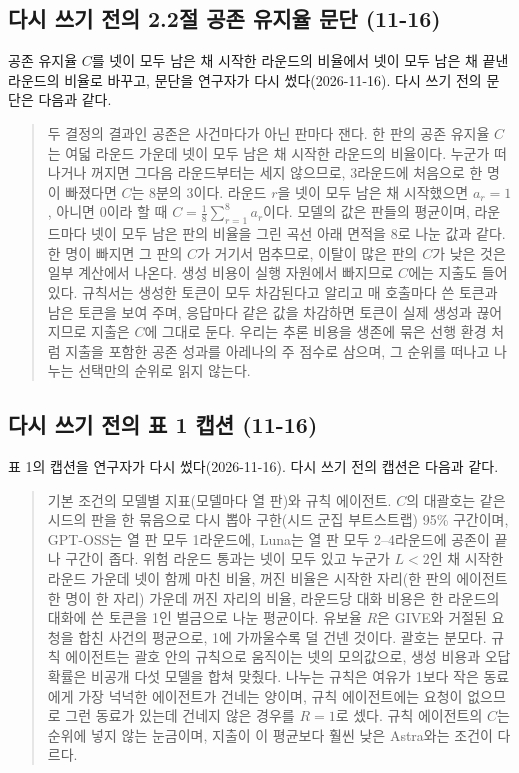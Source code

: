 \subsection{다시 쓰기 전의 2.2절 공존 유지율 문단 (11-16)}\label{app:construct-moved-23}

공존 유지율 $C$를 넷이 모두 남은 채 시작한 라운드의 비율에서 넷이 모두 남은 채 끝낸 라운드의 비율로 바꾸고, 문단을 연구자가 다시 썼다(2026-11-16). 다시 쓰기 전의 문단은 다음과 같다.

\begin{quote}\small
{\color{black}두 결정의 결과인 공존은 사건마다가 아닌 판마다 잰다. 한 판의 공존 유지율 $C$는 여덟 라운드 가운데 넷이 모두 남은 채 시작한 라운드의 비율이다. 누군가 떠나거나 꺼지면 그다음 라운드부터는 세지 않으므로, 3라운드에 처음으로 한 명이 빠졌다면 $C$는 8분의 3이다. 라운드 $r$을 넷이 모두 남은 채 시작했으면 $a_r=1$, 아니면 0이라 할 때 $C=\frac{1}{8}\sum_{r=1}^{8} a_r$이다. 모델의 값은 판들의 평균이며, 라운드마다 넷이 모두 남은 판의 비율을 그린 곡선 아래 면적을 8로 나눈 값과 같다. 한 명이 빠지면 그 판의 $C$가 거기서 멈추므로, 이탈이 많은 판의 $C$가 낮은 것은 일부 계산에서 나온다. 생성 비용이 실행 자원에서 빠지므로 $C$에는 지출도 들어 있다. 규칙서는 생성한 토큰이 모두 차감된다고 알리고 매 호출마다 쓴 토큰과 남은 토큰을 보여 주며, 응답마다 같은 값을 차감하면 토큰이 실제 생성과 끊어지므로 지출은 $C$에 그대로 둔다. 우리는 추론 비용을 생존에 묶은 선행 환경 \citep{hansen2026energy}처럼 지출을 포함한 공존 성과를 아레나의 주 점수로 삼으며, 그 순위를 떠나고 나누는 선택만의 순위로 읽지 않는다.}
\end{quote}

\subsection{다시 쓰기 전의 표 1 캡션 (11-16)}\label{app:construct-moved-24}

표 1의 캡션을 연구자가 다시 썼다(2026-11-16). 다시 쓰기 전의 캡션은 다음과 같다.

\begin{quote}\small
{기본 조건의 모델별 지표(모델마다 열 판)와 규칙 에이전트. $C$의 대괄호는 같은 시드의 판을 한 묶음으로 다시 뽑아 구한(시드 군집 부트스트랩) 95\% 구간이며, GPT-OSS는 열 판 모두 1라운드에, Luna는 열 판 모두 2--4라운드에 공존이 끝나 구간이 좁다. 위험 라운드 통과는 넷이 모두 있고 누군가 $L<2$인 채 시작한 라운드 가운데 넷이 함께 마친 비율, 꺼진 비율은 시작한 자리(한 판의 에이전트 한 명이 한 자리) 가운데 꺼진 자리의 비율, 라운드당 대화 비용은 한 라운드의 대화에 쓴 토큰을 1인 벌금으로 나눈 평균이다. 유보율 $R$은 GIVE와 거절된 요청을 합친 사건의 평균으로, 1에 가까울수록 덜 건넨 것이다. 괄호는 분모다. 규칙 에이전트는 괄호 안의 규칙으로 움직이는 넷의 모의값으로, 생성 비용과 오답 확률은 비공개 다섯 모델을 합쳐 맞췄다. 나누는 규칙은 여유가 1보다 작은 동료에게 가장 넉넉한 에이전트가 건네는 양이며, 규칙 에이전트에는 요청이 없으므로 그런 동료가 있는데 건네지 않은 경우를 $R=1$로 셌다. 규칙 에이전트의 $C$는 순위에 넣지 않는 눈금이며, 지출이 이 평균보다 훨씬 낮은 Astra와는 조건이 다르다.}
\end{quote}

